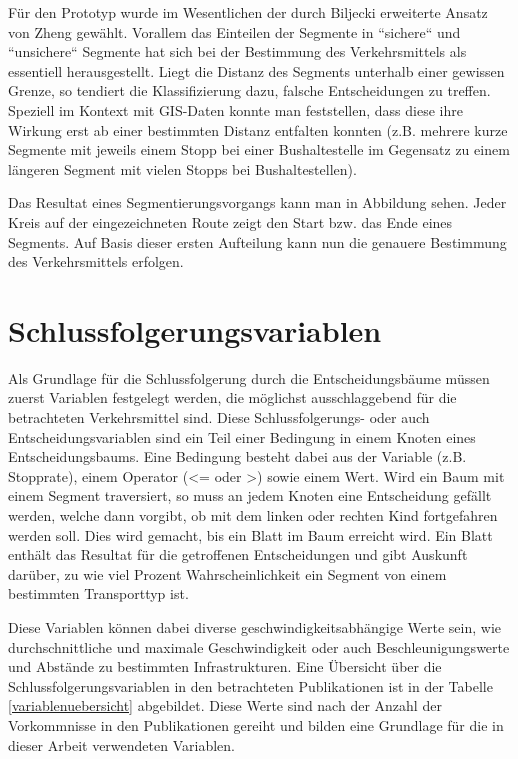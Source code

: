 Für den Prototyp wurde im Wesentlichen der durch Biljecki erweiterte Ansatz von Zheng gewählt. Vorallem das Einteilen der Segmente in ``sichere`` und ``unsichere`` Segmente hat sich bei der Bestimmung des Verkehrsmittels als essentiell herausgestellt. Liegt die Distanz  des Segments unterhalb einer gewissen Grenze, so tendiert die Klassifizierung dazu, falsche Entscheidungen zu treffen. Speziell im Kontext mit  GIS-Daten konnte man feststellen, dass diese ihre Wirkung erst ab einer bestimmten Distanz entfalten konnten (z.B. mehrere kurze Segmente mit jeweils einem Stopp bei einer Bushaltestelle im Gegensatz zu einem längeren Segment mit vielen Stopps bei Bushaltestellen).

 Das Resultat eines Segmentierungsvorgangs kann man in Abbildung  sehen. Jeder Kreis auf der eingezeichneten Route zeigt den Start bzw. das Ende eines Segments. Auf Basis dieser ersten Aufteilung kann nun die genauere Bestimmung des Verkehrsmittels erfolgen.


\section{Schlussfolgerungsvariablen}
\label{schlussfolgerungsvariablen}

Als Grundlage für die Schlussfolgerung durch die Entscheidungsbäume müssen zuerst Variablen festgelegt werden, die möglichst ausschlaggebend für die betrachteten Verkehrsmittel sind. Diese Schlussfolgerungs- oder auch Entscheidungsvariablen sind ein Teil einer Bedingung in einem Knoten eines Entscheidungsbaums. Eine Bedingung besteht dabei aus der Variable (z.B. Stopprate), einem Operator (<= oder >) sowie einem Wert. Wird ein Baum mit einem Segment traversiert, so muss an jedem Knoten eine Entscheidung gefällt werden, welche dann vorgibt, ob mit dem linken oder rechten Kind fortgefahren werden soll. Dies wird gemacht, bis ein Blatt im Baum erreicht wird. Ein Blatt enthält das Resultat für die  getroffenen Entscheidungen und gibt Auskunft darüber, zu wie viel Prozent Wahrscheinlichkeit ein Segment von einem bestimmten Transporttyp ist.

Diese Variablen können dabei diverse geschwindigkeitsabhängige Werte sein, wie durchschnittliche und maximale Geschwindigkeit oder auch Beschleunigungswerte und  Abstände zu bestimmten Infrastrukturen. Eine Übersicht über die Schlussfolgerungsvariablen in den betrachteten Publikationen ist in der Tabelle \ref{variablenuebersicht} abgebildet. Diese Werte sind nach der Anzahl der Vorkommnisse in den Publikationen gereiht und bilden eine Grundlage für die in dieser Arbeit verwendeten Variablen. 

